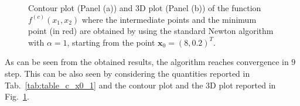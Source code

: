 \documentclass[a4paper,11pt]{article}
\begin{document}
	\begin{figure}[H]
		\centering
		 \quad
		\caption{Contour plot (Panel (a)) and 3D plot (Panel (b)) of the function $f^{(c)}(x_{1},x_{2})$ where the intermediate points and the minimum point (in red) are obtained by using the standard Newton algorithm with $\alpha=1$, starting from the point $\textbf{x}_{0}=(8,0.2)^{T}$.}
		\label{Fig:func_c}
	\end{figure}

	\noindent As can be seen from the obtained results, the algorithm reaches convergence in $9$ step. This can be also seen by considering the quantities reported in Tab.~\ref{tab:table_c_x0_1} and the contour plot and the 3D plot reported in Fig.~\ref{Fig:func_c}.\\
	
\end{document}
